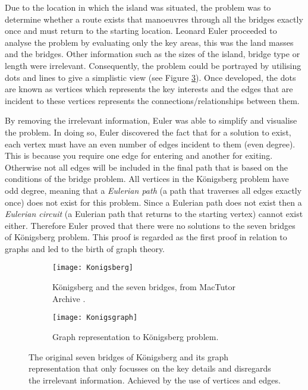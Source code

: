 Due to the location in which the island was situated, the problem was to determine whether a route exists that manoeuvres through all the bridges exactly once and must return to the starting location. Leonard Euler proceeded to analyse the problem by evaluating only the key areas, this was the land masses and the bridges. Other information such as the sizes of the island, bridge type or length were irrelevant. Consequently, the problem could be portrayed by utilising dots and lines to give a simplistic view (see Figure \ref{fig:Königsberg's Graph}). Once developed, the dots are known as vertices which represents the key interests and the edges that are incident to these vertices represents the connections/relationships between them.

By removing the irrelevant information, Euler was able to simplify and visualise the problem. In doing so, Euler discovered the fact that for a solution to exist, each vertex must have an even number of edges incident to them (even degree). This is because you require one edge for entering and another for exiting. Otherwise not all edges will be included in the final path that is based on the conditions of the bridge problem. All vertices in the Königsberg problem have odd degree, meaning that a \emph{Eulerian path} (a path that traverses all edges exactly once) does not exist for this problem. Since a Eulerian path does not exist then a \emph{Eulerian circuit} (a Eulerian path that returns to the starting vertex) cannot exist either. Therefore Euler proved that there were no solutions to the seven bridges of Königsberg problem. This proof is regarded as the first proof in relation to graphs and led to the birth of graph theory.

\begin{figure}[!htb]
\centering
\begin{subfigure}{.45\textwidth}
	\texttt{[image: Konigsberg]}
	\caption{Königsberg and the seven bridges, from MacTutor Archive \cite{MacTutor}.}
	\label{fig:Königsberg's Bridges}
\end{subfigure}
\hfill
\begin{subfigure}{.45\textwidth}
	\texttt{[image: Konigsgraph]}
	\caption{Graph representation to Königsberg problem.}
	\label{fig:Königsberg's Graph}
\end{subfigure}
\caption{The original seven bridges of Königsberg and its graph representation that only focusses on the key details and disregards the irrelevant information. Achieved by the use of vertices and edges.}
\end{figure}

